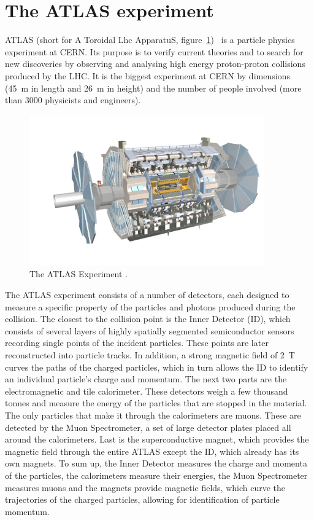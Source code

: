 \section{The ATLAS experiment}
ATLAS (short for A Toroidal Lhc ApparatuS, figure~\ref{fig:atlas})~\cite{} is a particle physics experiment at CERN. Its purpose is to verify current theories and to search for new discoveries by observing and analysing high energy proton-proton collisions produced by the LHC. It is the biggest experiment at CERN by dimensions (45~m in length and 26~m in height) and the number of people involved (more than 3000 physicists and engineers).
\begin{figure}[!t]
\centering
\includegraphics[width=0.9\textwidth]{01_introduction/pics/atlas3}
\caption{The ATLAS Experiment \cite{Pequenao:1095924}.}
\label{fig:atlas}
\end{figure}
The ATLAS experiment consists of a number of detectors, each designed to measure a specific property of the particles and photons produced during the collision. The closest to the collision point is the Inner Detector (ID), which consists of several layers of highly spatially segmented semiconductor sensors recording single points of the incident particles. These points are later reconstructed into particle tracks. In addition, a strong magnetic field of 2~T curves the paths of the charged particles, which in turn allows the ID to identify an individual particle's charge and momentum. The next two parts are the electromagnetic and tile calorimeter. These detectors weigh a few thousand tonnes and measure the energy of the particles that are stopped in the material. The only particles that make it through the calorimeters are muons. These are detected by the Muon Spectrometer, a set of large detector plates placed all around the calorimeters. Last is the superconductive magnet, which provides the magnetic field through the entire ATLAS except the ID, which already has its own magnets. To sum up, the Inner Detector measures the charge and momenta of the particles, the calorimeters measure their energies, the Muon Spectrometer measures muons and the magnets provide magnetic fields, which curve the trajectories of the charged particles, allowing for identification of particle momentum.

